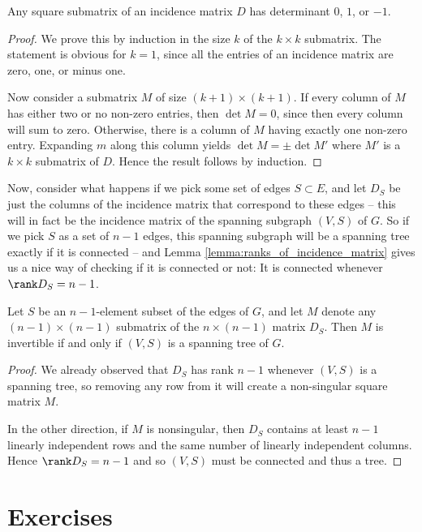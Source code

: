 \documentclass[nobib]{tufte-handout}
\begin{document}
\begin{lemma}
    Any square submatrix of an incidence matrix $D$ has determinant $0$, $1$, or $-1$.

    \begin{proof}
        We prove this by induction in the size $k$ of the $k\times k$ submatrix. The statement is obvious for $k=1$, since all the entries of an incidence matrix are zero, one, or minus one.

        Now consider a submatrix $M$ of size $(k+1)\times(k+1)$. If every column of $M$ has either two or no non-zero entries, then $\det M = 0$, since then every column will sum to zero. Otherwise, there is a column of $M$ having exactly one non-zero entry. Expanding $m$ along this column yields $\det M = \pm \det M'$ where $M'$ is a $k \times k$ submatrix of $D$. Hence the result follows by induction.
    \end{proof}
\end{lemma}

Now, consider what happens if we pick some set of edges $S \subset E$, and let $D_S$ be just the columns of the incidence matrix that correspond to these edges -- this will in fact be the incidence matrix of the spanning subgraph $(V, S)$ of $G$. So if we pick $S$ as a set of $n-1$ edges, this spanning subgraph will be a spanning tree exactly if it is connected -- and Lemma \ref{lemma:ranks_of_incidence_matrix} gives us a nice way of checking if it is connected or not: It is connected whenever $\rank D_S = n - 1$.

\begin{lemma}
    Let $S$ be an $n-1$-element subset of the edges of $G$, and let $M$ denote any $(n-1)\times (n-1)$ submatrix of the $n \times (n-1)$ matrix $D_S$. Then $M$ is invertible if and only if $(V,S)$ is a spanning tree of $G$.

    \begin{proof}
        We already observed that $D_S$ has rank $n-1$ whenever $(V,S)$ is a spanning tree, so removing any row from it will create a non-singular square matrix $M$.

        In the other direction, if $M$ is nonsingular, then $D_S$ contains at least $n-1$ linearly independent rows and the same number of linearly independent columns. Hence $\rank D_S = n - 1$ and so $(V,S)$ must be connected and thus a tree.
    \end{proof}
\end{lemma}

\section{Exercises}

%
%
\end{document}
